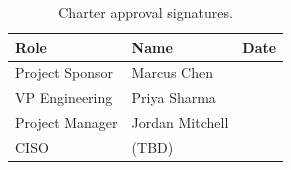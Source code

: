 \documentclass[
    language=english,
    doctype=project-charter,
    institution=none,
]{../../omnilatex}
\begin{document}
\begin{table}[h]
    \centering
    \begin{tabular}{lll}
        \toprule
        \textbf{Role} & \textbf{Name} & \textbf{Date} \\
        \midrule
        Project Sponsor   & Marcus Chen & \underline{\hspace{3cm}} \\
        VP Engineering    & Priya Sharma & \underline{\hspace{3cm}} \\
        Project Manager   & Jordan Mitchell & \underline{\hspace{3cm}} \\
        CISO              & (TBD) & \underline{\hspace{3cm}} \\
        \bottomrule
    \end{tabular}
    \caption{Charter approval signatures.}
\end{table}

\printbibliography[heading=none]
\end{document}
